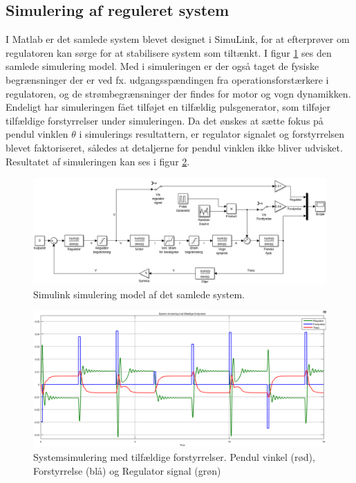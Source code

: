 \subsection{Simulering af reguleret system}
I Matlab er det samlede system blevet designet i SimuLink, for at efterprøver om regulatoren kan sørge for at stabilisere system som tiltænkt.
I figur \ref{fig:transfunc_sim} ses den samlede simulering model.
Med i simuleringen er der også taget de fysiske begrænsninger der er ved fx. udgangsspændingen fra operationsforstærkere i regulatoren, og de strømbegrænsninger der findes for motor og vogn dynamikken.
Endeligt har simuleringen fået tilføjet en tilfældig pulsgenerator, som tilføjer tilfældige forstyrrelser under simuleringen.
Da det ønskes at sætte fokus på pendul vinklen $\theta$ i simulerings resultattern, er regulator signalet og forstyrrelsen blevet faktoriseret, således at detaljerne for pendul vinklen ikke bliver udvisket.
Resultatet af simuleringen kan ses i figur \ref{fig:system_sim_stimuli}.
\begin{figure}[h!]
	\centering
	\includegraphics[width=1\textwidth]{billeder/transfunc_sim.png}
	\caption{Simulink simulering model af det samlede system.}
	\label{fig:transfunc_sim}
\end{figure}


\begin{figure}[h!]
	\centering
	\includegraphics[width=1\textwidth]{billeder/system_sim_stimuli.png}
	\caption[Systemsimulering med tilfældige forstyrrelser.]{Systemsimulering med tilfældige forstyrrelser. Pendul vinkel (rød), Forstyrrelse (blå) og Regulator signal (grøn)}
	\label{fig:system_sim_stimuli}
\end{figure}
\FloatBlock 


